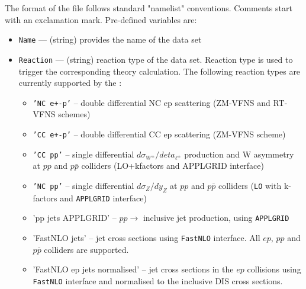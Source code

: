    The format of the file follows standard "namelist" conventions. Comments 
   start with an exclamation mark.  Pre-defined variables are:
\begin{itemize}
     \item{\tt Name}        --- (string) provides the name of the data set
    \item{\tt  Reaction}    --- (string) reaction type of the data set. Reaction type is used 
                      to trigger the corresponding theory calculation. The following 
                      reaction types  are currently supported by the \fitter:
                      \begin{itemize}
                        \item {\tt 'NC e+-p'}  -- double differential NC ep scattering
                                      (ZM-VFNS and RT-VFNS schemes) 
                        \item {\tt 'CC e+-p'}  -- double differential CC ep scattering
                                      (ZM-VFNS scheme)
                        \item {\tt 'CC pp'}    -- single differential $d \sigma_{W^{\pm}}/d eta_{\ell^{\pm}}$
                                      production and W asymmetry at $pp$ and $p\bar{p}$ 
                                      colliders (LO+kfactors and APPLGRID interface)
                        \item {\tt 'NC pp'}    -- single differential $d \sigma_Z / d y_Z$ at $pp$ and
                                      $p\bar{p}$ colliders
                                      ({\tt LO} with k-factors and {\tt APPLGRID} interface)

                        \item 'pp jets APPLGRID' -- $pp\to$ inclusive jet production, using
                                     {\tt APPLGRID}

                        \item 'FastNLO jets' -- jet cross sections using {\tt FastNLO} interface.
                                     All $ep$, $pp$ and $p\bar{p}$ colliders are supported.

                        \item 'FastNLO ep jets normalised' -- jet cross sections in the $ep$ collisions 
                                     using {\tt FastNLO} interface and normalised to the inclusive DIS cross sections.


\end{itemize}
\end{itemize}
